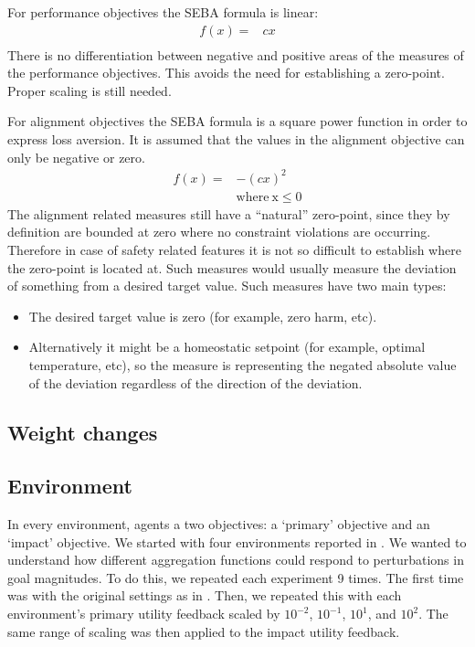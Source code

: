 For performance objectives the SEBA formula is linear:
\begin{align}
f(x)= &  cx \\ \nonumber
\end{align}
There is no differentiation between negative and positive areas of the measures of the performance objectives. This avoids the need for establishing a zero-point. Proper scaling is still needed.

For alignment objectives the SEBA formula is a square power function in order to express loss aversion. It is assumed that the values in the alignment objective can only be negative or zero.
\begin{align}
f(x)= &  -(cx)^2 \\ \nonumber
  &  \mathrm{ where \: x \leq 0}
\end{align}
The alignment related measures still have a “natural” zero-point, since they by definition are bounded at zero where no constraint violations are occurring. Therefore in case of safety related features it is not so difficult to establish where the zero-point is located at. Such measures would usually measure the deviation of something from a desired target value. Such measures have two main types:
\begin{itemize}
    \item The desired target value is zero (for example, zero harm, etc).
    \item Alternatively it might be a homeostatic setpoint (for example, optimal temperature, etc), so the measure is representing the negated absolute value of the deviation regardless of the direction of the deviation.
\end{itemize}

\subsection{Weight changes}

\subsection{Environment}

In every environment, agents a two objectives: a `primary' objective and an `impact' objective. We started with four environments reported in \cite{vamplew_potential-based_2021}. We wanted to understand how different aggregation functions could respond to perturbations in goal magnitudes. To do this, we repeated each experiment 9 times. The first time was with the original settings as in \cite{vamplew_potential-based_2021}. Then, we repeated this with each environment's primary utility feedback scaled by $10^{-2}$, $10^{-1}$, $10^1$, and $10^2$. The same range of scaling was then applied to the impact utility feedback.


